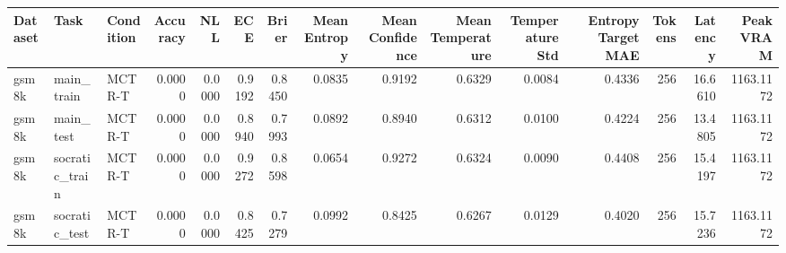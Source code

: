 \begin{tabular}{lllrrrrrrrrrrrr}
\toprule
Dataset & Task & Condition & Accuracy & NLL & ECE & Brier & Mean Entropy & Mean Confidence & Mean Temperature & Temperature Std & Entropy Target MAE & Tokens & Latency & Peak VRAM \\
\midrule
gsm8k & main_train & MCTR-T & 0.0000 & 0.0000 & 0.9192 & 0.8450 & 0.0835 & 0.9192 & 0.6329 & 0.0084 & 0.4336 & 256 & 16.6610 & 1163.1172 \\
gsm8k & main_test & MCTR-T & 0.0000 & 0.0000 & 0.8940 & 0.7993 & 0.0892 & 0.8940 & 0.6312 & 0.0100 & 0.4224 & 256 & 13.4805 & 1163.1172 \\
gsm8k & socratic_train & MCTR-T & 0.0000 & 0.0000 & 0.9272 & 0.8598 & 0.0654 & 0.9272 & 0.6324 & 0.0090 & 0.4408 & 256 & 15.4197 & 1163.1172 \\
gsm8k & socratic_test & MCTR-T & 0.0000 & 0.0000 & 0.8425 & 0.7279 & 0.0992 & 0.8425 & 0.6267 & 0.0129 & 0.4020 & 256 & 15.7236 & 1163.1172 \\
\bottomrule
\end{tabular}

